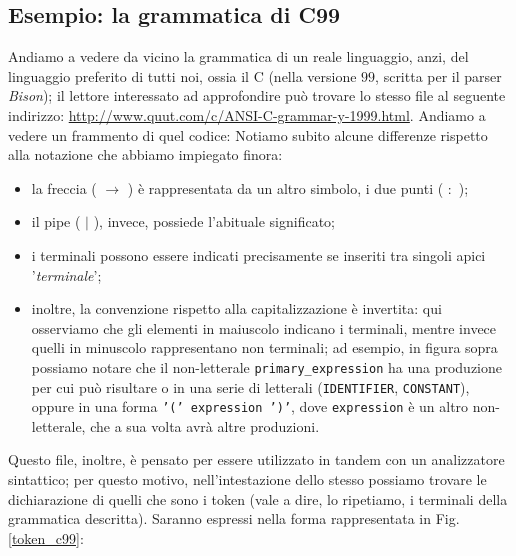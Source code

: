 \documentclass[class=book, crop=false, oneside, 12pt]{standalone}
\begin{document}
\subsection{Esempio: la grammatica di C99}
Andiamo a vedere da vicino la grammatica di un reale linguaggio, anzi, del linguaggio preferito di tutti noi, ossia il C (nella versione \(99\), scritta per il parser \emph{Bison}); il lettore interessato ad approfondire può trovare lo stesso file al seguente indirizzo: \url{http://www.quut.com/c/ANSI-C-grammar-y-1999.html}. Andiamo a vedere un frammento di quel codice:
Notiamo subito alcune differenze rispetto alla notazione che abbiamo impiegato finora: 
\begin{itemize}
    \item la freccia ( \(\to\) ) è rappresentata da un altro simbolo, i due punti ( \(:\) );
    \item il pipe ( \(\mid\) ), invece, possiede l'abituale significato;
    \item i terminali possono essere indicati precisamente se inseriti tra singoli apici '\emph{terminale}';
    \item inoltre, la convenzione rispetto alla capitalizzazione è invertita: qui osserviamo che gli elementi in maiuscolo indicano i terminali, mentre invece quelli in minuscolo rappresentano non terminali; ad esempio, in figura sopra possiamo notare che il non-letterale \texttt{primary\_expression} ha una produzione per cui può risultare o in una serie di letterali (\texttt{IDENTIFIER}, \texttt{CONSTANT}), oppure in una forma \texttt{'(' expression ')'}, dove \texttt{expression} è un altro non-letterale, che a sua volta avrà altre produzioni.
\end{itemize}

Questo file, inoltre, è pensato per essere utilizzato in tandem con un analizzatore sintattico; per questo motivo, nell'intestazione dello stesso possiamo trovare le dichiarazione di quelli che sono i token (vale a dire, lo ripetiamo, i terminali della grammatica descritta). Saranno espressi nella forma rappresentata in Fig.\ref{token_c99}:
\end{document}
